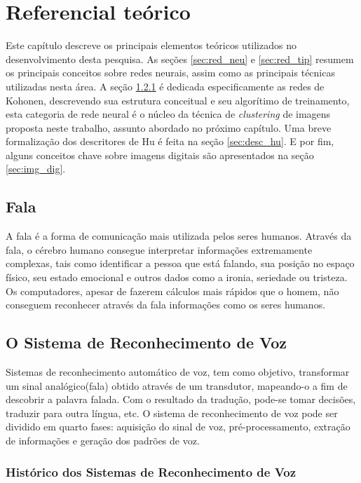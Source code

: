 \chapter{Referencial teórico}

Este capítulo descreve os principais elementos teóricos utilizados no
desenvolvimento desta pesquisa. As seções \ref{sec:red_neu} e \ref{sec:red_tip}
resumem os principais conceitos sobre redes neurais, assim como as principais
técnicas utilizadas nesta área. A seção \ref{sec:red_khn} é dedicada
especificamente as redes de Kohonen, descrevendo sua estrutura conceitual e seu
algorítimo de treinamento, esta categoria de rede neural é o núcleo da técnica
de \textit{clustering} de imagens proposta neste trabalho, assunto abordado no
próximo capítulo. Uma breve formalização dos descritores de Hu é feita na seção
\ref{sec:desc_hu}. E por fim, alguns conceitos chave sobre imagens digitais são
apresentados na seção \ref{sec:img_dig}.

\section{Fala}
A fala é a forma de comunicação mais utilizada pelos seres humanos.\cite{RvPatrick} Através da fala, o cérebro humano consegue interpretar informações extremamente complexas, tais como identificar a pessoa que está falando, sua posição no espaço físico, seu estado emocional e outros dados como a ironia, seriedade ou tristeza. Os computadores, apesar de fazerem cálculos mais rápidos que o homem, não conseguem reconhecer através da fala informações como os seres humanos.

\section{O Sistema de Reconhecimento de Voz}\label{sec:red_khn}
Sistemas de reconhecimento automático de voz, tem como objetivo, transformar um sinal analógico(fala) obtido através de um transdutor, mapeando-o a fim de descobrir a palavra falada. Com o resultado da tradução, pode-se tomar decisões, traduzir para outra língua, etc.
O sistema de reconhecimento de voz pode ser dividido em quarto fases: aquisição do sinal de voz, pré-processamento,
extração de informações e geração dos padrões de voz. \cite{RavIsoladas}

\subsection{Histórico dos Sistemas de Reconhecimento de Voz}\label{sec:red_khn}

